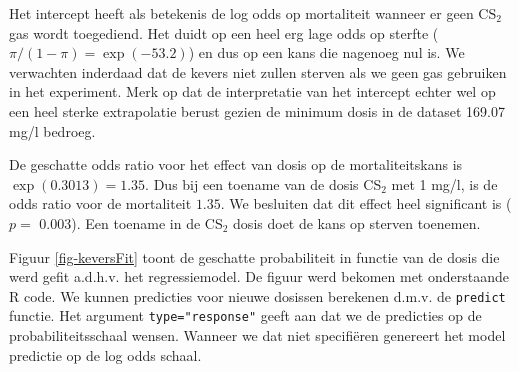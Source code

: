 \documentclass[
  dutch,
  letterpaper,
  12pt]{book}
\theoremstyle{definition}
\theoremstyle{definition}
\theoremstyle{definition}
\theoremstyle{remark}
\begin{document}
Het intercept heeft als betekenis de log odds op mortaliteit wanneer er
geen \(\text{CS}_2\) gas wordt toegediend. Het duidt op een heel erg
lage odds op sterfte (\(\pi/(1-\pi)=\exp(-53.2)\)) en dus op een kans
die nagenoeg nul is. We verwachten inderdaad dat de kevers niet zullen
sterven als we geen gas gebruiken in het experiment. Merk op dat de
interpretatie van het intercept echter wel op een heel sterke
extrapolatie berust gezien de minimum dosis in de dataset 169.07 mg/l
bedroeg.

De geschatte odds ratio voor het effect van dosis op de mortaliteitskans
is \(\exp(0.3013)=1.35\). Dus bij een toename van de dosis CS\(_2\) met
1 mg/l, is de odds ratio voor de mortaliteit \(1.35\). We besluiten dat
dit effect heel significant is (\(p=\) 0.003). Een toename in de
CS\(_2\) dosis doet de kans op sterven toenemen.

Figuur \ref{fig-keversFit} toont de geschatte probabiliteit in functie
van de dosis die werd gefit a.d.h.v. het regressiemodel. De figuur werd
bekomen met onderstaande R code. We kunnen predicties voor nieuwe
dosissen berekenen d.m.v. de \texttt{predict} functie. Het argument
\texttt{type="response"} geeft aan dat we de predicties op de
probabiliteitsschaal wensen. Wanneer we dat niet specifiëren genereert
het model predictie op de log odds schaal.
\end{document}

